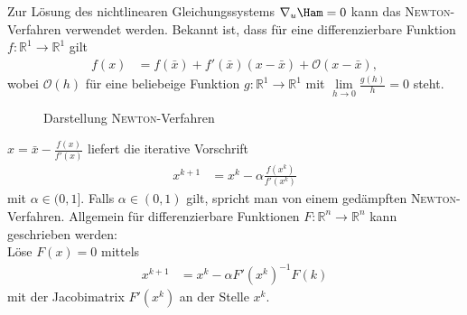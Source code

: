 Zur Lösung des nichtlinearen Gleichungssystems $\nabla_u \Ham =0$ kann das \textsc{Newton}-Verfahren verwendet werden. Bekannt ist, dass für eine
differenzierbare Funktion $f:\mathbb{R}^1\rightarrow\mathbb{R}^1$ gilt
\begin{align*}
	f(x) & = f(\bar{x})+f'(\bar{x})(x-\bar{x})+\mathcal{O}(x-\bar{x}),
\end{align*}
wobei $\mathcal{O}(h)$ für eine beliebeige Funktion $g:\mathbb{R}^1\rightarrow\mathbb{R}^1$ mit $\lim\limits_{h\rightarrow 0}\frac{g(h)}{h}=0$
steht.\\
\begin{figure}[htb]
	\centering
	
	\caption{Darstellung \textsc{Newton}-Verfahren}
	\label{fig:kap_2_fallc_newton}
\end{figure}
$x=\bar{x}-\frac{f(x)}{f'(x)}$ liefert die iterative Vorschrift
\begin{align*}
	x^{k+1} & = x^k - \alpha\frac{f\left(x^k\right)}{f'\left(x^k \right)}
\end{align*}
mit $\alpha\in(0,1]$. Falls $\alpha\in(0,1)$ gilt, spricht man von einem gedämpften \textsc{Newton}-Verfahren. Allgemein für differenzierbare
Funktionen $F:\mathbb{R}^n\rightarrow\mathbb{R}^n$ kann geschrieben werden:\\
Löse $F(x)=0$ mittels
\begin{align*}
	x^{k+1} & = x^k - \alpha F'\left(x^k\right)^{-1}F(k)
\end{align*}
mit der Jacobimatrix $F'\left(x^k\right)$ an der Stelle $x^k$.

